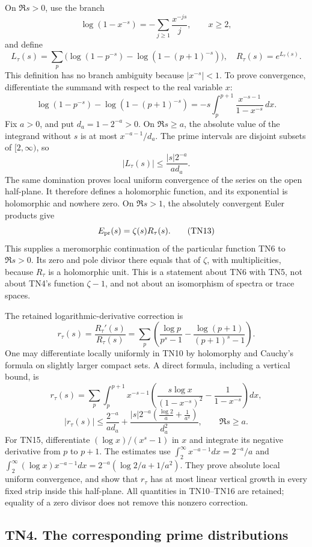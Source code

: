 \documentclass[
  10pt,
  a4paper,
]{article}
\begin{document}
On \(\Re s>0\), use the branch \[
\log(1-x^{-s})=-\sum_{j\ge1}\frac{x^{-js}}j,\qquad x\ge2,
\] and define \[
L_\tau(s)=\sum_p\bigl(\log(1-p^{-s})-\log(1-(p+1)^{-s})\bigr),
\quad R_\tau(s)=e^{L_\tau(s)}.
\tag{TN10}
\] This definition has no branch ambiguity because \(|x^{-s}|<1\). To
prove convergence, differentiate the summand with respect to the real
variable \(x\): \[
\log(1-p^{-s})-\log(1-(p+1)^{-s})
=-s\int_p^{p+1}\frac{x^{-s-1}}{1-x^{-s}}\,dx.
\tag{TN11}
\] Fix \(a>0\), and put \(d_a=1-2^{-a}>0\). On \(\Re s\ge a\), the
absolute value of the integrand without \(s\) is at most
\(x^{-a-1}/d_a\). The prime intervals are disjoint subsets of
\([2,\infty)\), so \[
|L_\tau(s)|\le \frac{|s|2^{-a}}{a d_a}.
\tag{TN12}
\] The same domination proves local uniform convergence of the series on
the open half-plane. It therefore defines a holomorphic function, and
its exponential is holomorphic and nowhere zero. On \(\Re s>1\), the
absolutely convergent Euler products give \[
E_{\rm pr}(s)=\zeta(s)R_\tau(s).
\tag{TN13}
\] This supplies a meromorphic continuation of the particular function
TN6 to \(\Re s>0\). Its zero and pole divisor there equals that of
\(\zeta\), with multiplicities, because \(R_\tau\) is a holomorphic
unit. This is a statement about TN6 with TN5, not about TN4's function
\(\zeta-1\), and not about an isomorphism of spectra or trace spaces.

The retained logarithmic-derivative correction is \[
r_\tau(s)=\frac{R_\tau'(s)}{R_\tau(s)}
=\sum_p\left(\frac{\log p}{p^s-1}
-\frac{\log(p+1)}{(p+1)^s-1}\right).
\tag{TN14}
\] One may differentiate locally uniformly in TN10 by holomorphy and
Cauchy's formula on slightly larger compact sets. A direct formula,
including a vertical bound, is \[
r_\tau(s)=\sum_p\int_p^{p+1}x^{-s-1}
\left(\frac{s\log x}{(1-x^{-s})^2}-\frac1{1-x^{-s}}\right)dx,
\tag{TN15}
\] \[
|r_\tau(s)|\le
\frac{2^{-a}}{a d_a}
+\frac{\displaystyle |s|2^{-a}\left(\frac{\log2}{a}+\frac1{a^2}\right)}{d_a^2},
\qquad \Re s\ge a.
\tag{TN16}
\] For TN15, differentiate \((\log x)/(x^s-1)\) in \(x\) and integrate
its negative derivative from \(p\) to \(p+1\). The estimates use
\(\int_2^\infty x^{-a-1}dx=2^{-a}/a\) and
\(\int_2^\infty(\log x)x^{-a-1}dx=2^{-a}(\log2/a+1/a^2)\). They prove
absolute local uniform convergence, and show that \(r_\tau\) has at most
linear vertical growth in every fixed strip inside this half-plane. All
quantities in TN10--TN16 are retained; equality of a zero divisor does
not remove this nonzero correction.

\subsection{TN4. The corresponding prime
distributions}\label{tn4.-the-corresponding-prime-distributions}
\end{document}
